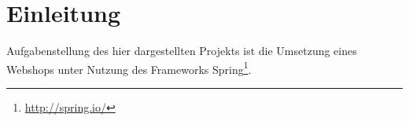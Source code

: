 \section{Einleitung}
	Aufgabenstellung des hier dargestellten Projekts ist die Umsetzung eines Webshops unter Nutzung des Frameworks Spring\footnote{\hyperlink{http://spring.io/}{http://spring.io/}}.